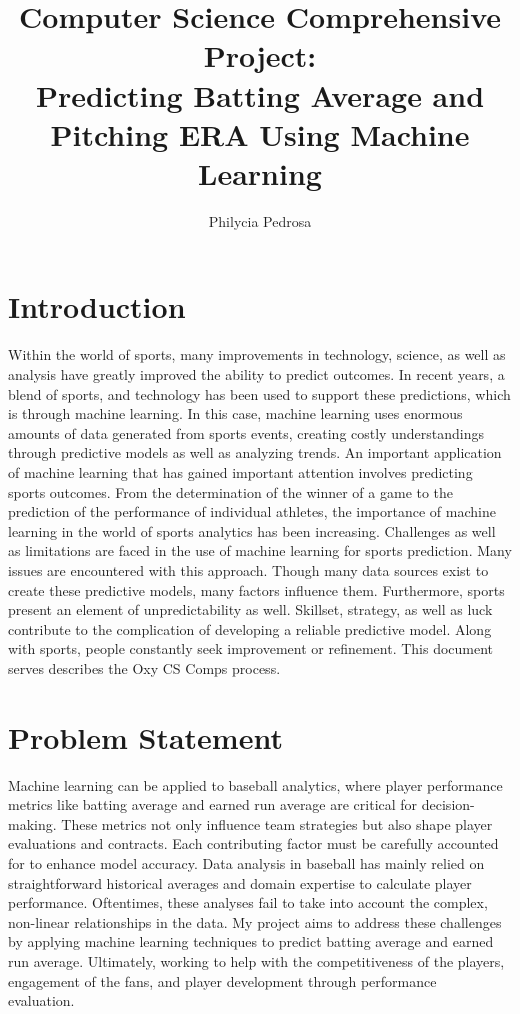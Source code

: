 \documentclass[10pt,twocolumn]{article}
\title{Computer Science Comprehensive Project: \\ Predicting Batting Average and Pitching ERA Using Machine Learning}
\author{Philycia Pedrosa}
\affiliation{Occidental College}
\begin{document}
\maketitle

\section{Introduction}

    Within the world of sports, many improvements in technology, science, as well as analysis have greatly improved the ability to predict outcomes. In recent years, a blend of sports, and technology has been used to support these predictions, which is through machine learning. In this case, machine learning uses enormous amounts of data generated from sports events, creating costly understandings through predictive models as well as analyzing trends. An important application of machine learning that has gained important attention involves predicting sports outcomes. From the determination of the winner of a game to the prediction of the performance of individual athletes, the importance of machine learning in the world of sports analytics has been increasing. Challenges as well as limitations are faced in the use of machine learning for sports prediction. Many issues are encountered with this approach. Though many data sources exist to create these predictive models, many factors influence them. Furthermore, sports present an element of unpredictability as well. Skillset, strategy, as well as luck contribute to the complication of developing a reliable predictive model. Along with sports, people constantly seek improvement or refinement. This document serves describes the Oxy CS Comps process.

\section{Problem Statement}

    Machine learning can be applied to baseball analytics, where player performance metrics like batting average and earned run average are critical for decision-making. These metrics not only influence team strategies but also shape player evaluations and contracts. Each contributing factor must be carefully accounted for to enhance model accuracy. Data analysis in baseball has mainly relied on straightforward historical averages and domain expertise to calculate player performance. Oftentimes, these analyses fail to take into account the complex, non-linear relationships in the data. My project aims to address these challenges by applying machine learning techniques to predict batting average and earned run average. Ultimately, working to help with the competitiveness of the players, engagement of the fans, and player development through performance evaluation. 
\end{document}
